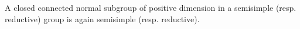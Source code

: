 A closed connected normal subgroup of positive dimension in a semisimple (resp. reductive) group is again semisimple (resp. reductive).
